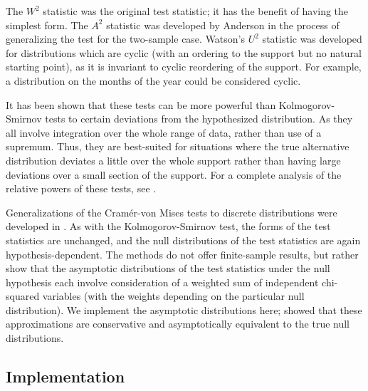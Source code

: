The $W^2$
statistic was the original test statistic; it has the benefit of having
the simplest form.
The $A^2$ statistic was developed by
Anderson in the process of generalizing the test for the two-sample case.
Watson's $U^2$ statistic was developed for distributions
which are cyclic (with an ordering to the support but
no natural starting point), as it is invariant to cyclic reordering of
the support. 
For example, a distribution on the months of the year could be considered
cyclic.

It has been shown that these tests can be more powerful than Kolmogorov-Smirnov tests to certain deviations from the hypothesized distribution. 
As they all involve
integration over the whole range of data, rather than use of a supremum.
Thus, they are best-suited for situations where the
true alternative distribution deviates a little over the whole support
rather than having large deviations over a small section of the support. For
a complete analysis of the relative powers of these tests, see 
\cite{stephens1974}.



Generalizations of the Cram\'{e}r-von Mises tests to discrete
distributions were developed in \cite{choulakian1994}. As with the
Kolmogorov-Smirnov test, the forms of the test statistics are unchanged, 
and the null distributions of the test statistics are again hypothesis-dependent. The methods do not offer finite-sample results, but rather 
show that the asymptotic distributions of the test statistics under the null hypothesis each involve consideration of a weighted sum of independent
chi-squared variables (with the weights depending on the particular
null distribution). 
We implement the asymptotic distributions here; \cite{stephens1974}
showed that these approximations are conservative 
and asymptotically equivalent to the true null distributions.


\subsection{Implementation}

